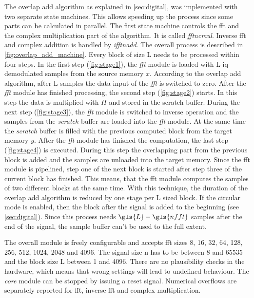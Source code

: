 \documentclass[12pt,a4paper,parskip=full,abstract=true,BCOR=12mm,twoside,open=right]{scrreprt}
\def\device#1{\textit{#1}}
\begin{document}
The overlap add algorithm as explained in \cref{sec:digital}, was implemented with
two separate state machines. This allows speeding up the process since some parts can be calculated in parallel.
The first state machine controls the \gls{fft} and the complex multiplication part of the
algorithm. It is called \device{fftncmul}. Inverse \gls{fft} and complex
addition is handled by \device{ifftnadd}. The overall process is described in
\cref{fig:overlap_add_machine}. Every block of size \gls{L}
needs to be processed within four steps. In the first step (\cref{fig:stage1}),
the \device{fft} module is loaded with \gls{L} \gls{iq} demodulated samples from the source memory $x$. According to
the overlap add algorithm, after \gls{L} samples the data input of the \device{fft}
is switched to zero. After the \device{fft} module has finished processing,
the second step (\cref{fig:stage2}) starts. In this step the data is multiplied
with $H$ and stored in the scratch buffer. During the next step (\cref{fig:stage3}),
the \device{fft} module is switched to inverse operation and the samples from the
\device{scratch} buffer are loaded into the \device{fft} module. At the same time
the \device{scratch} buffer is filled with the previous computed block from the target
memory $y$. After the \device{fft} module has finished the computation, the last step (\cref{fig:stage4})
is executed. During this step the overlapping part from the previous block is added and
the samples are unloaded into the target memory. Since the \gls{fft}
module is pipelined, step one of the next block is started after step three
of the current block has finished. This means, that the \gls{fft} module computes
the samples of two different blocks at the same time. With this technique, the
duration of the overlap add algorithm is reduced by one stage per \gls{L} sized block.
If the circular mode is enabled, then the block after the signal is added to the
beginning (see \cref{sec:digital}). Since this process needs $\gls{L} - \gls{nfft}$ samples
after the end of the signal, the sample buffer can't be used to the full extent.

The overall module is freely configurable and accepts \gls{fft} sizes 8, 16,
32, 64, 128, 256, 512, 1024, 2048 and 4096. The signal size \gls{n} has to be between
8 and 65535 and the block size \gls{L} between 1 and 4096. There are no plausibility
checks in the hardware, which means that wrong settings will lead to undefined
behaviour. The \device{core} module can be stopped by issuing a reset signal.
Numerical overflows are separately reported for \gls{fft}, inverse \gls{fft}
and complex multiplication.
\end{document}
